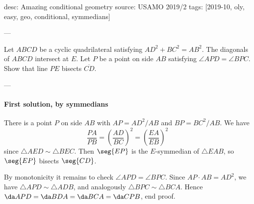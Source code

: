 desc: Amazing conditional geometry
source: USAMO 2019/2
tags: [2019-10, oly, easy, geo, conditional, symmedians]

---

Let $ABCD$ be a cyclic quadrilateral satisfying $AD^2+BC^2=AB^2$. The diagonals of $ABCD$ intersect at $E$. Let $P$ be a point on side $AB$ satisfying $\angle APD=\angle BPC$. Show that line $PE$ bisects $\overline{CD}$.

---

\paragraph{First solution, by symmedians} There is a point $P$ on side $AB$ with $AP=AD^2/AB$ and $BP=BC^2/AB$. We have \[\frac{PA}{PB}=\left(\frac{AD}{BC}\right)^2=\left(\frac{EA}{EB}\right)^2\]
since $\triangle AED\sim\triangle BEC$. Then $\seg{EP}$ is the $E$-symmedian of $\triangle EAB$, so $\seg{EP}$ bisects $\seg{CD}$.

By monotonicity it remains to check $\angle APD=\angle BPC$. Since $AP\cdot AB=AD^2$, we have $\triangle APD\sim\triangle ADB$, and analogously $\triangle BPC\sim\triangle BCA$. Hence $\da APD=\da BDA=\da BCA=\da CPB$, end proof.


